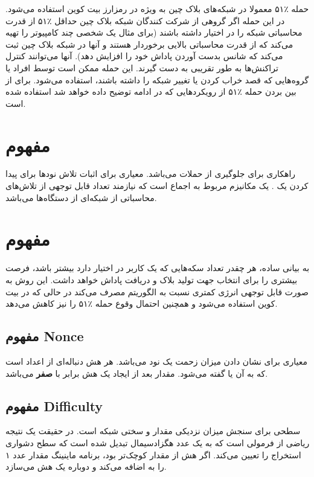 \documentclass[10pt, a4paper]{article}
\begin{document}
حمله ٪۵۱ معمولا در شبکه‌های بلاک چین به ویژه در رمزارز بیت کوین استفاده می‌شود.
در این حمله اگر گروهی از شرکت کنندگان شبکه بلاک چین حداقل ٪۵۱ از قدرت محاسباتی
شبکه را در اختیار داشته باشند (برای مثال یک شخصی چند کامپیوتر را تهیه می‌کند که
از قدرت محاسباتی بالایی برخوردار هستند و آنها در شبکه بلاک چین ثبت می‌کند که
شانس بدست آوردن پاداش خود را افزایش دهد). آنها می‌توانند کنترل تراکنش‌ها به طور
تقریبی به دست گیرند. این حمله ممکن است توسط افراد یا گروه‌هایی که قصد خراب کردن
یا تغییر شبکه را داشته باشند، استفاده می‌شود. برای از بین بردن حمله ٪۵۱ از
رویکرد‌هایی که در ادامه توضیح داده خواهد شد استفاده شده است.

\section{مفهوم }

راهکاری برای جلوگیری از حملات  می‌باشد. معیاری برای اثبات تلاش نود‌ها
برای پیدا کردن یک . یک مکانیزم مربوط به اجماع است که نیازمند تعداد
قابل توجهی از تلاش‌های محاسباتی از شبکه‌ای از دستگاه‌ها می‌باشد.

\section{مفهوم }

به بیانی ساده، هر چقدر تعداد سکه‌هایی که یک کاربر در اختیار دارد بیشتر باشد،
فرصت بیشتری را برای انتخاب جهت تولید بلاک و دریافت پاداش خواهد داشت. این روش به
صورت قابل توجهی انرژی کمتری نسبت به الگوریتم  مصرف می‌کند در حالی که در
بیت کوین استفاده می‌شود و همچنین احتمال وقوع حمله ٪۵۱ را نیز کاهش می‌دهد.

\subsection{مفهوم Nonce}

معیاری برای نشان دادن میزان زحمت یک نود می‌باشد. هر هش دنباله‌ای از اعداد است که
به آن  یا  گفته می‌شود. مقدار  بعد از
ایجاد یک هش برابر با \textbf{صفر} می‌باشد.

\subsection{مفهوم Difficulty}

سطحی برای سنجش میزان نزدیکی مقدار  و سختی شبکه است. در حقیقت یک نتیجه
ریاضی از فرمولی است که به یک عدد هگزادسیمال تبدیل شده است که سطح دشواری استخراج
را تعیین می‌کند. اگر هش از مقدار  کوچک‌تر بود، برنامه ماینینگ
مقدار عدد ۱ را به  اضافه می‌کند و دوباره یک هش می‌سازد.
\end{document}
